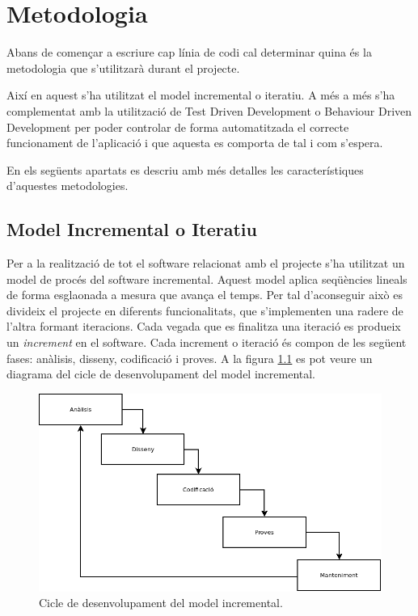 \chapter{Metodologia}
\label{chap:metodologia}

Abans de començar a escriure cap línia de codi cal determinar quina és la metodologia que s'utilitzarà durant el projecte. 

Així en aquest s'ha utilitzat el model incremental o iteratiu. A més a més s'ha complementat amb la utilització de Test Driven Development o Behaviour Driven Development per poder controlar de forma automatitzada el correcte funcionament de l'aplicació i que aquesta es comporta de tal i com s'espera.

En els següents apartats es descriu amb més detalles les característiques d'aquestes metodologies.  

\section{Model Incremental o Iteratiu}

Per a la realització de tot el software relacionat amb el projecte s’ha utilitzat un model de procés del software incremental. Aquest model aplica seqüències lineals de forma esglaonada a mesura que avança el temps. Per tal d'aconseguir això es divideix el projecte en diferents funcionalitats, que s'implementen una radere de l'altra formant iteracions. Cada vegada que es finalitza una iteració es produeix un \emph{increment} en el software. Cada increment o iteració és compon de les següent fases: anàlisis, disseny, codificació i proves. A la figura \ref{fig:mii} es pot veure un diagrama del cicle de desenvolupament del model incremental.

\begin{figure}[htbp]
\centering\includegraphics[width=12cm]{img/model-incremental.png}
\caption{Cicle de desenvolupament del model incremental.}
\label{fig:mii}
\end{figure} 

